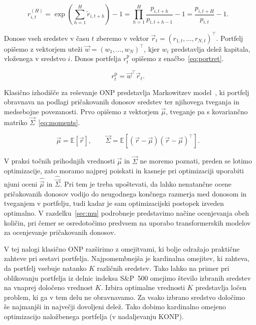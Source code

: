 \documentclass[9pt]{style/friteza}
\begin{document}
\begin{equation}
\label{eq:cum-return}
r_{i,t}^{(H)}
=
\exp\left(
\sum_{h=1}^{H}\tilde r_{i,t+h}
\right)-1
=
\prod_{h=1}^{H}\frac{p_{i,t+h}}{p_{i,t+h-1}}-1
=
\frac{p_{i,t+H}}{p_{i,t}}-1.
\end{equation}

Donose vseh sredstev v času $t$ zberemo v vektor $\vec{r}_t=(r_{1,t},\dots,r_{N,t})^{\top}$. Portfelj opišemo z vektorjem uteži $\vec{w}=(w_1,\dots,w_N)^{\top}$, kjer $w_i$ predstavlja delež kapitala, vloženega v sredstvo $i$. Donos portfelja $r_t^{\mathrm p}$ opišemo z enačbo~\eqref{eq:portret}.

\begin{equation}
\label{eq:portret}
r_t^{\mathrm p}
=
\vec{w}^{\top}\vec{r}_t.
\end{equation}

Klasično izhodišče za reševanje ONP predstavlja Markowitzev model~\cite{markowitz1952}, ki portfelj obravnava na podlagi pričakovanih donosov sredstev ter njihovega tveganja in medsebojne povezanosti. Prvo opišemo z vektorjem $\vec{\mu}$, tveganje pa s kovariančno matriko $\vec{\Sigma}$~\eqref{eq:moments}. 

\begin{equation}
\label{eq:moments}
\vec{\mu}
=
\mathbb{E}[\vec{r}],
\qquad
\vec{\Sigma}
=
\mathbb{E}
\left[
(\vec{r}-\vec{\mu})
(\vec{r}-\vec{\mu})^{\top}
\right].
\end{equation}

V praksi točnih prihodnjih vrednosti $\vec{\mu}$ in $\vec{\Sigma}$ ne moremo poznati, preden se lotimo optimizacije, zato moramo najprej poiskati in kasneje pri optimizaciji uporabiti njuni oceni $\hat{\vec{\mu}}$ in $\hat{\vec{\Sigma}}$. Pri tem je treba upoštevati, da lahko nenatančne ocene pričakovanih donosov vodijo do neugodnega končnega razmerja med donosom in tveganjem v portfelju, tudi kadar je sam optimizacijski postopek izveden optimalno. V razdelku~\ref{sec:mu} podrobneje predstavimo načine ocenjevanja obeh količin, pri čemer se osredotočimo predvsem na uporabo transformerskih modelov za ocenjevanje pričakovanih donosov.

V tej nalogi klasično ONP razširimo z omejitvami, ki bolje odražajo praktične zahteve pri sestavi portfelja. Najpomembnejša je kardinalna omejitev, ki zahteva, da portfelj vsebuje natanko $K$ različnih sredstev. Tako lahko na primer pri oblikovanju portfelja iz delnic indeksa S\&P~500 omejimo število izbranih sredstev na vnaprej določeno vrednost $K$. Izbira optimalne vrednosti $K$ predstavlja ločen problem, ki ga v tem delu ne obravnavamo. Za vsako izbrano sredstvo določimo še najmanjši in največji dovoljeni delež. Tako dobimo kardinalno omejeno optimizacijo naložbenega portfelja (v nadaljevanju KONP). 
\end{document}
